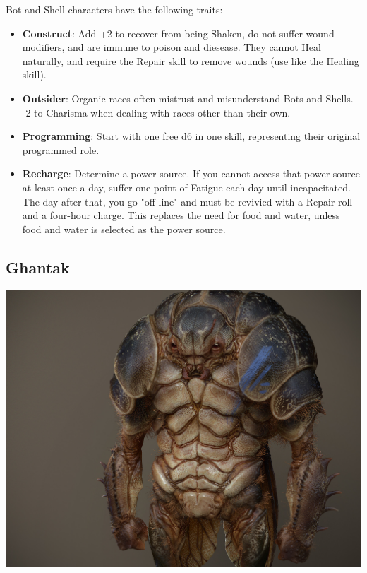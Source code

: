 \documentclass[10pt,twoside]{article}
\begin{document}
\begin{multicols}{2}
        Bot and Shell characters have the following traits:
        
        \begin{itemize}
            \item \textbf{Construct}: Add +2 to recover from being Shaken, do not suffer wound modifiers, and are immune to poison and diesease. They cannot Heal naturally, and require the Repair skill to remove wounds (use like the Healing skill).

            \item \textbf{Outsider}: Organic races often mistrust and misunderstand Bots and Shells. -2 to Charisma when dealing with races other than their own.

            \item \textbf{Programming}: Start with one free d6 in one skill, representing their original programmed role.

            \item \textbf{Recharge}: Determine a power source. If you cannot access that power source at least once a day, suffer one point of Fatigue each day until incapacitated. The day after that, you go "off-line" and must be revivied with a Repair roll and a four-hour charge. This replaces the need for food and water, unless food and water is selected as the power source.
        \end{itemize}

        \subsection{Ghantak}
        
        \includegraphics[width=\linewidth]{bruno-camara-beetle-brunocamara.jpg}
        

\end{multicols}
\end{document}
